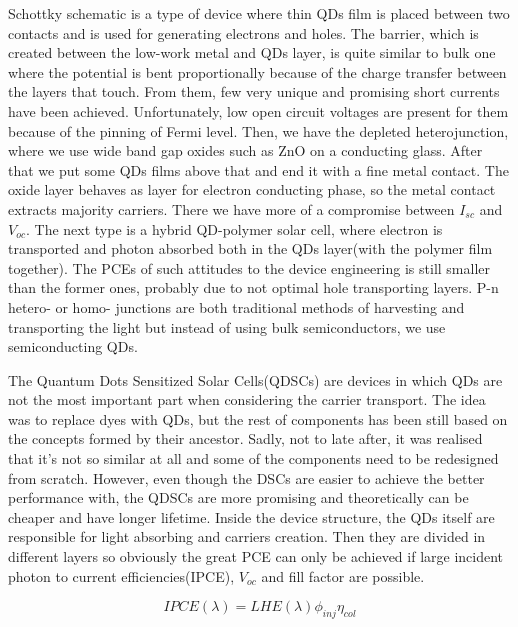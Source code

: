 Schottky schematic is a type of device where thin QDs film is placed between two contacts and is used for generating electrons and holes. The barrier, which is created between the low-work metal and QDs layer, is quite similar to bulk one where the potential is bent proportionally because of the charge transfer between the layers that touch. From them, few very unique and promising short currents have been achieved. Unfortunately, low open circuit voltages are present for them because of the pinning of Fermi level. Then, we have the depleted heterojunction, where we use wide band gap oxides such as ZnO on a conducting glass. After that we put some QDs films above that and end it with a fine metal contact. The oxide layer behaves as layer for electron conducting phase, so the metal contact extracts majority carriers. There we have more of a compromise between $I_{sc}$ and $V_{oc}$.  The next type is a hybrid QD-polymer solar cell, where electron is transported and photon absorbed both in the QDs layer(with the polymer film together). The PCEs of such attitudes to the device engineering is still smaller than the former ones, probably due to not optimal hole transporting layers. P-n hetero- or homo- junctions are both traditional methods of harvesting and transporting the light but instead of using bulk semiconductors, we use semiconducting QDs. 

The Quantum Dots Sensitized Solar Cells(QDSCs) are devices in which QDs are not the most important part when considering the carrier transport. The idea was to replace dyes with QDs, but the rest of components has been still based on the concepts formed by their ancestor. Sadly, not to late after, it was realised that it's not so similar at all and some of the components need to be redesigned from scratch. However, even though the DSCs are easier to achieve the better performance with, the QDSCs are more promising and theoretically can be cheaper and have longer lifetime. Inside the device structure, the QDs itself are responsible for light absorbing and carriers creation. Then they are divided in different layers so obviously the great PCE can only be achieved if large incident photon to current efficiencies(IPCE), $V_{oc}$ and fill factor are possible. 

\begin{equation}
IPCE(\lambda ) = LHE(\lambda ) \phi_{inj} \eta_{col}
\end{equation}

